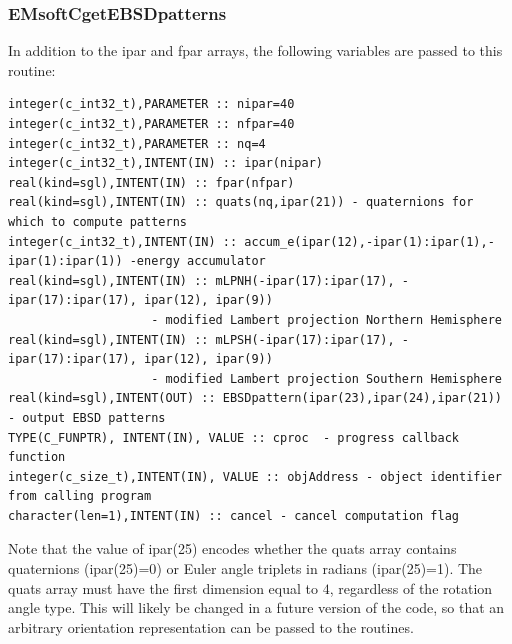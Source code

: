 \documentclass[DIV=calc, paper=letter, fontsize=11pt]{scrartcl}	 %
\begin{document}
\subsubsection{EMsoftCgetEBSDpatterns}
In addition to the \textsf{ipar} and \textsf{fpar} arrays, the following variables are 
passed to this routine:
{\footnotesize\begin{verbatim}
integer(c_int32_t),PARAMETER :: nipar=40
integer(c_int32_t),PARAMETER :: nfpar=40
integer(c_int32_t),PARAMETER :: nq=4
integer(c_int32_t),INTENT(IN) :: ipar(nipar)
real(kind=sgl),INTENT(IN) :: fpar(nfpar)
real(kind=sgl),INTENT(IN) :: quats(nq,ipar(21)) - quaternions for which to compute patterns
integer(c_int32_t),INTENT(IN) :: accum_e(ipar(12),-ipar(1):ipar(1),-ipar(1):ipar(1)) -energy accumulator
real(kind=sgl),INTENT(IN) :: mLPNH(-ipar(17):ipar(17), -ipar(17):ipar(17), ipar(12), ipar(9))
					- modified Lambert projection Northern Hemisphere
real(kind=sgl),INTENT(IN) :: mLPSH(-ipar(17):ipar(17), -ipar(17):ipar(17), ipar(12), ipar(9))
					- modified Lambert projection Southern Hemisphere
real(kind=sgl),INTENT(OUT) :: EBSDpattern(ipar(23),ipar(24),ipar(21)) - output EBSD patterns
TYPE(C_FUNPTR), INTENT(IN), VALUE :: cproc  - progress callback function
integer(c_size_t),INTENT(IN), VALUE :: objAddress - object identifier from calling program
character(len=1),INTENT(IN) :: cancel - cancel computation flag
\end{verbatim}}
Note that the value of \textsf{ipar(25)} encodes whether the \textsf{quats} array contains quaternions (\textsf{ipar(25)=0})
or Euler angle triplets in radians (\textsf{ipar(25)=1}).  The \textsf{quats} array must have the first dimension equal to $4$,
regardless of the rotation angle type.  This will likely be changed in a future version of the code, so that an arbitrary 
orientation representation can be passed to the routines.
\end{document}
